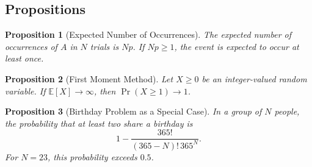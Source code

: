 \documentclass[11pt]{amsart}
\theoremstyle{plain}
\newtheorem{proposition}{Proposition}
\theoremstyle{remark}
\begin{document}
\subsection{Propositions}

\begin{proposition}[Expected Number of Occurrences]
\label{prop:expected}
The expected number of occurrences of \(A\) in \(N\) trials is \(Np\). If
\(Np \ge 1\), the event is expected to occur at least once.
\end{proposition}

\begin{proposition}[First Moment Method]
\label{prop:first-moment}
Let \(X \ge 0\) be an integer-valued random variable. If
\(\mathbb{E}[X] \to \infty\), then \(\Pr(X \ge 1) \to 1\).
\end{proposition}

\begin{proposition}[Birthday Problem as a Special Case]
\label{prop:birthday}
In a group of \(N\) people, the probability that at least two share a
birthday is
\begin{equation}
\label{eq:birthday}
1 - \frac{365!}{(365-N)! \, 365^N}.
\end{equation}
For \(N=23\), this probability exceeds \(0.5\).
\end{proposition}
\end{document}

